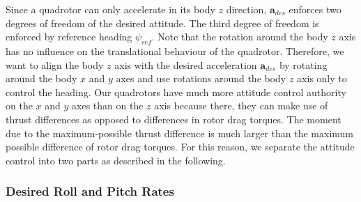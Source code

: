 \documentclass[10pt,a4paper,fleqn]{article}
\newcommand{\yawRef}{\ensuremath{\psi_{ref}}}
\newcommand{\accDes}{\ensuremath{\bVec{a}_{des}}}
\newcommand{\bVec}[1]{\mathbf{#1}}
\begin{document}
Since a quadrotor can only accelerate in its body $z$ direction, $\accDes{}$ enforces two degrees of freedom of the desired attitude.
The third degree of freedom is enforced by reference heading $\yawRef$.
Note that the rotation around the body $z$ axis has no influence on the translational behaviour of the quadrotor.
Therefore, we want to align the body $z$ axis with the desired acceleration $\accDes{}$ by rotating around the body $x$ and $y$ axes and use rotations around the body $z$ axis only to control the heading.
Our quadrotors have much more attitude control authority on the $x$ and $y$ axes than on the $z$ axis because there, they can make use of thrust differences as opposed to differences in rotor drag torques.
The moment due to the maximum-possible thrust difference is much larger than the maximum possible difference of rotor drag torques.
For this reason, we separate the attitude control into two parts as described in the following.

\subsubsection*{Desired Roll and Pitch Rates} \label{sec:roll_pitch_control}
\end{document}

